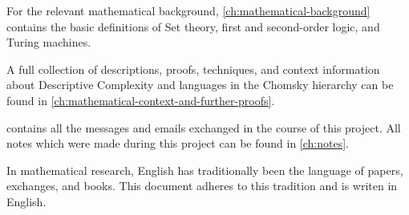 For the relevant mathematical background, \cref{ch:mathematical-background} contains the basic definitions of Set theory, first and second-order logic, and Turing machines.

A full collection of descriptions, proofs, techniques, and context information about Descriptive Complexity and languages in the Chomsky hierarchy can be found in \cref{ch:mathematical-context-and-further-proofs}.

 contains all the messages and emails exchanged in the course of this project.
All notes which were made during this project can be found in \cref{ch:notes}.

In mathematical research, English has traditionally been the language of papers, exchanges, and books.
This document adheres to this tradition and is writen in English.